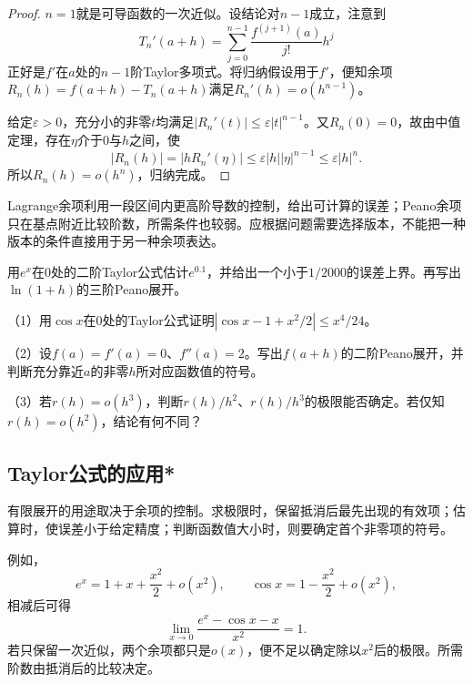 \begin{proof}
\(n=1\)就是可导函数的一次近似。设结论对\(n-1\)成立，注意到
\begin{equation*}
 T_n'(a+h)=\sum_{j=0}^{n-1}\frac{f^{(j+1)}(a)}{j!}h^j
\end{equation*}
正好是\(f'\)在\(a\)处的\(n-1\)阶Taylor多项式。将归纳假设用于\(f'\)，便知余项\(R_n(h)=f(a+h)-T_n(a+h)\)满足\(R_n'(h)=o(h^{n-1})\)。

给定\(\varepsilon>0\)，充分小的非零\(t\)均满足\(|R_n'(t)|\le\varepsilon|t|^{n-1}\)。又\(R_n(0)=0\)，故由中值定理，存在\(\eta\)介于\(0\)与\(h\)之间，使
\begin{equation*}
 |R_n(h)|=|hR_n'(\eta)|\le\varepsilon|h||\eta|^{n-1}\le\varepsilon|h|^n.
\end{equation*}
所以\(R_n(h)=o(h^n)\)，归纳完成。
\end{proof}

Lagrange余项利用一段区间内更高阶导数的控制，给出可计算的误差；Peano余项只在基点附近比较阶数，所需条件也较弱。应根据问题需要选择版本，不能把一种版本的条件直接用于另一种余项表达。

\begin{example}
用\(e^x\)在\(0\)处的二阶Taylor公式估计\(e^{0.1}\)，并给出一个小于\(1/2000\)的误差上界。再写出\(\ln(1+h)\)的三阶Peano展开。
\end{example}

\begin{exercise}
\mbox{}\par\nobreak

（1）用\(\cos x\)在\(0\)处的Taylor公式证明\(|\cos x-1+x^2/2|\le x^4/24\)。

（2）设\(f(a)=f'(a)=0\)、\(f''(a)=2\)。写出\(f(a+h)\)的二阶Peano展开，并判断充分靠近\(a\)的非零\(h\)所对应函数值的符号。

（3）若\(r(h)=o(h^3)\)，判断\(r(h)/h^2\)、\(r(h)/h^3\)的极限能否确定。若仅知\(r(h)=o(h^2)\)，结论有何不同？
\end{exercise}

\subsection{Taylor公式的应用*}

有限展开的用途取决于余项的控制。求极限时，保留抵消后最先出现的有效项；估算时，使误差小于给定精度；判断函数值大小时，则要确定首个非零项的符号。

例如，
\begin{equation*}
 e^x=1+x+\frac{x^2}2+o(x^2),\qquad
 \cos x=1-\frac{x^2}2+o(x^2),
\end{equation*}
相减后可得
\begin{equation*}
 \lim_{x\to0}\frac{e^x-\cos x-x}{x^2}=1.
\end{equation*}
若只保留一次近似，两个余项都只是\(o(x)\)，便不足以确定除以\(x^2\)后的极限。所需阶数由抵消后的比较决定。

